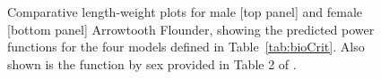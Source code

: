 \begin{figure}[htp]
\captionsetup[subfigure]{labelformat=empty}
\begin{center}
\newline
{}
\end{center}
\caption{Comparative length-weight plots for male [top panel] and female [bottom panel] Arrowtooth Flounder, showing the predicted power functions for the four models defined in Table~\ref{tab:bioCrit}. Also shown is the function by sex provided in Table 2 of \citet{arf2001}.}
\label{fig:lwCompare}
\end{figure}

